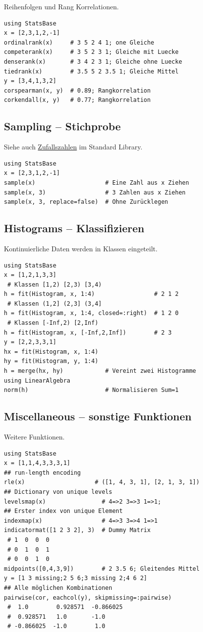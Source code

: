 \documentclass[10pt,twocolumn]{scrartcl}
\begin{document}
Reihenfolgen und Rang Korrelationen.

\begin{lstlisting}
using StatsBase
x = [2,3,1,2,-1]
ordinalrank(x)     # 3 5 2 4 1; one Gleiche
competerank(x)     # 3 5 2 3 1; Gleiche mit Luecke
denserank(x)       # 3 4 2 3 1; Gleiche ohne Luecke
tiedrank(x)        # 3.5 5 2 3.5 1; Gleiche Mittel
y = [3,4,1,3,2]
corspearman(x, y)  # 0.89; Rangkorrelation
corkendall(x, y)   # 0.77; Rangkorrelation
\end{lstlisting}

\subsection{Sampling -- Stichprobe}
\label{ssec:StatsBase_Sampling}

Siehe auch \hyperref[ssec:standardLibrary_Random]{Zufallszahlen} im Standard
Library.

\begin{lstlisting}
using StatsBase
x = [2,3,1,2,-1]
sample(x)                    # Eine Zahl aus x Ziehen
sample(x, 3)                 # 3 Zahlen aus x Ziehen
sample(x, 3, replace=false)  # Ohne Zurücklegen
\end{lstlisting}

\subsection{Histograms -- Klassifizieren}

Kontinuierliche Daten werden in Klassen eingeteilt.

\begin{lstlisting}
using StatsBase
x = [1,2,1,3,3]
 # Klassen [1,2) [2,3) [3,4)
h = fit(Histogram, x, 1:4)                 # 2 1 2
 # Klassen (1,2] (2,3] (3,4]
h = fit(Histogram, x, 1:4, closed=:right)  # 1 2 0
 # Klassen [-Inf,2) [2,Inf)
h = fit(Histogram, x, [-Inf,2,Inf])        # 2 3
y = [2,2,3,3,1]
hx = fit(Histogram, x, 1:4)
hy = fit(Histogram, y, 1:4)
h = merge(hx, hy)            # Vereint zwei Histogramme
using LinearAlgebra
norm(h)                      # Normalisieren Sum=1
\end{lstlisting}

\subsection{Miscellaneous -- sonstige Funktionen}

Weitere Funktionen.

\begin{lstlisting}
using StatsBase
x = [1,1,4,3,3,3,1]
## run-length encoding
rle(x)                    # ([1, 4, 3, 1], [2, 1, 3, 1])
## Dictionary von unique levels
levelsmap(x)                # 4=>2 3=>3 1=>1;
## Erster index von unique Element
indexmap(x)                 # 4=>3 3=>4 1=>1
indicatormat([1 2 3 2], 3)  # Dummy Matrix
 # 1  0  0  0
 # 0  1  0  1
 # 0  0  1  0
midpoints([0,4,3,9])        # 2 3.5 6; Gleitendes Mittel
y = [1 3 missing;2 5 6;3 missing 2;4 6 2]
## Alle möglichen Kombinationen
pairwise(cor, eachcol(y), skipmissing=:pairwise)
 #  1.0        0.928571  -0.866025
 #  0.928571   1.0       -1.0
 # -0.866025  -1.0        1.0
\end{lstlisting}
\end{document}
